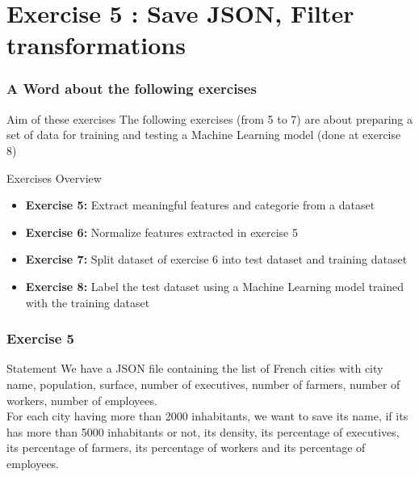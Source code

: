 \documentclass[slidetop,9pt,utf8]{beamer}
\begin{document}
\begin{CJK}{UTF8}{gbsn}
\begin{frame}[fragile]
\end{frame}

%
%
%
%

\section{Exercise 5 : Save JSON, Filter transformations}

\begin{frame}
  \frametitle{A Word about the following exercises}

  \begin{block}{Aim of these exercises}
    The following exercises (from 5 to 7) are about preparing a set of data for training and testing a Machine Learning model (done at exercise 8)
  \end{block}

  \begin{block}{Exercises Overview}
    \begin{itemize}
      \item \textbf{Exercise 5:} Extract meaningful features and categorie from a dataset
      \item \textbf{Exercise 6:} Normalize features extracted in exercise 5
      \item \textbf{Exercise 7:} Split dataset of exercise 6 into test dataset and training dataset
      \item \textbf{Exercise 8:} Label the test dataset using a Machine Learning model trained with the training dataset
    \end{itemize}
  \end{block}

\end{frame}

\begin{frame}
  \frametitle{Exercise 5}

  \begin{block}{Statement}
    We have a JSON file containing the list of French cities with city name, population, surface, number of executives, number of farmers, number of workers, number of employees. 
    \\ \medskip
    For each city having more than 2000 inhabitants, we want to save its name, if its has more than 5000 inhabitants or not, its density, its percentage of executives, its percentage of farmers, its percentage of workers and its percentage of employees.
  \end{block}


\end{frame}
\end{CJK}
\end{document}
